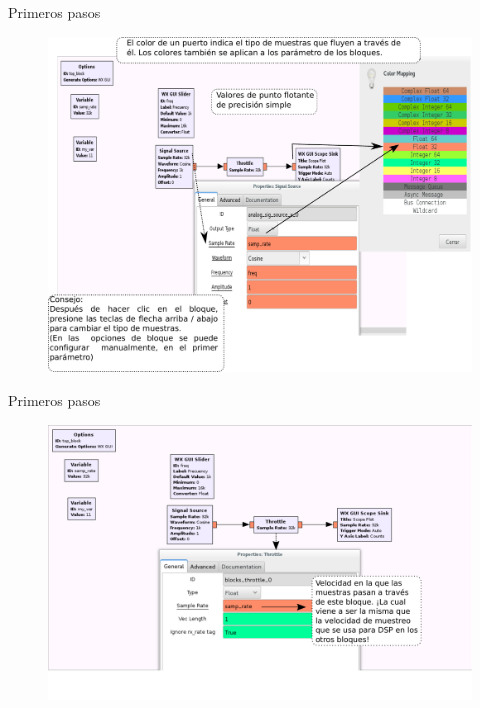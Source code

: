 \begin{frame}{Primeros pasos }
\begin{figure}[H]
\vspace{-3mm}
\centering
\includegraphics[width=.80\textwidth]{parte1/lab1/pdf/lab1_15.pdf}
\end{figure}
\end{frame}

\begin{frame}{Primeros pasos }
\begin{figure}[H]
\centering
\includegraphics[width=\textwidth]{parte1/lab1/pdf/lab1_16.pdf}
\end{figure}
\end{frame}

